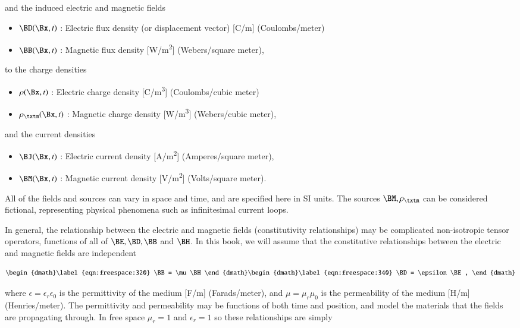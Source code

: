 and the induced electric and magnetic fields

\begin{itemize}
	\item \( \BD(\Bx, t) \) : Electric flux density (or displacement vector) [\si{C/m}] (Coulombs/meter)
	\item \( \BB(\Bx, t) \) : Magnetic flux density [\si{W/m^2}] (Webers/square meter),
\end{itemize}

to the charge densities

\begin{itemize}
	\item \( \rho(\Bx, t) \) : Electric charge density [\si{C/m^3}] (Coulombs/cubic meter)
   \item \( \rho_\txtm(\Bx, t) \) : Magnetic charge density [\si{W/m^3}] (Webers/cubic meter),
\end{itemize}

and the current densities

\begin{itemize}
	\item \( \BJ(\Bx, t) \) : Electric current density [\si{A/m^2}] (Amperes/square meter),
   \item \( \BM(\Bx, t) \) : Magnetic current density [\si{V/m^2}] (Volts/square meter).
\end{itemize}

All of the fields and sources can vary in space and time, and are specified here in SI units.
The sources \( \BM, \rho_\txtm \) can be considered fictional, representing physical phenomena such as infinitesimal current loops.

In general, the relationship between the electric and magnetic fields (constitutivity relationships) may be complicated
non-isotropic tensor operators, functions of all of \( \BE, \BD, \BB \) and \( \BH \).
In this book, we will assume that the constitutive relationships between the electric and magnetic fields are independent

\begin{subequations}
\label{eqn:freespace:300}
\begin{dmath}\label{eqn:freespace:320}
\BB = \mu \BH
\end{dmath}
\begin{dmath}\label{eqn:freespace:340}
\BD = \epsilon \BE,
\end{dmath}
\end{subequations}

where \( \epsilon = \epsilon_r \epsilon_0 \) is the permittivity of the medium [\si{F/m}] (Farads/meter), and \( \mu = \mu_r \mu_0 \) is the permeability of the medium [\si{H/m}] (Henries/meter).
The permittivity and permeability may be functions of both time and position, and model the materials that the fields are propagating through.
In free space \( \mu_r = 1 \) and \( \epsilon_r = 1\) so these relationships are simply

